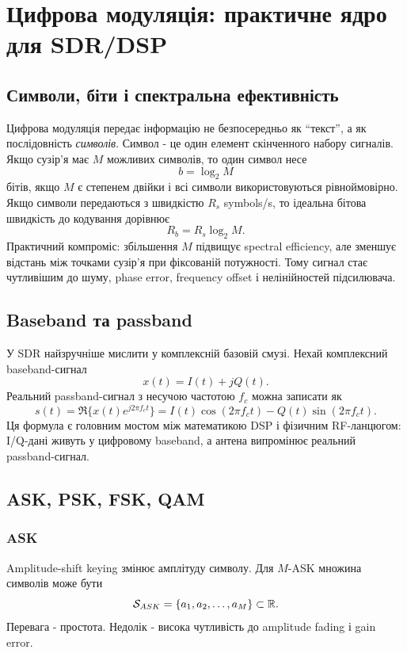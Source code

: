 \chapter{Цифрова модуляція: практичне ядро для SDR/DSP}
\label{ch:digital-modulation-practical-core}


\section{Символи, біти і спектральна ефективність}

Цифрова модуляція передає інформацію не безпосередньо як ``текст'', а як послідовність \emph{символів}. Символ - це один елемент скінченного набору сигналів. Якщо сузір'я має $M$ можливих символів, то один символ несе
\[
  b = \log_2 M
\]
бітів, якщо $M$ є степенем двійки і всі символи використовуються рівноймовірно. Якщо символи передаються з швидкістю $R_s$ symbols/s, то ідеальна бітова швидкість до кодування дорівнює
\[
  R_b = R_s \log_2 M.
\]
Практичний компроміс: збільшення $M$ підвищує spectral efficiency, але зменшує відстань між точками сузір'я при фіксованій потужності. Тому сигнал стає чутливішим до шуму, phase error, frequency offset і нелінійностей підсилювача.

\section{Baseband та passband}

У SDR найзручніше мислити у комплексній базовій смузі. Нехай комплексний baseband-сигнал
\[
  x(t) = I(t) + j Q(t).
\]
Реальний passband-сигнал з несучою частотою $f_c$ можна записати як
\[
  s(t)=\Re\{x(t)e^{j2\pi f_c t}\}
      = I(t)\cos(2\pi f_c t)-Q(t)\sin(2\pi f_c t).
\]
Ця формула є головним мостом між математикою DSP і фізичним RF-ланцюгом: I/Q-дані живуть у цифровому baseband, а антена випромінює реальний passband-сигнал.

\section{ASK, PSK, FSK, QAM}

\subsection{ASK}
Amplitude-shift keying змінює амплітуду символу. Для $M$-ASK множина символів може бути
\[
  \mathcal S_{ASK}=\{a_1,a_2,\ldots,a_M\}\subset\mathbb{R}.
\]
Перевага - простота. Недолік - висока чутливість до amplitude fading і gain error.

